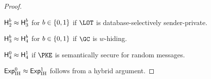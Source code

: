 \begin{proof}
\begin{claim}\label{clm:index-hiding-hyb23}
${\Hyb_2^b\approx\Hyb_3^b}$ for ${b\in{\{0,1\}}}$
if $\LOT$ is database-selectively sender-private.
\end{claim}

\begin{claim}\label{clm:index-hiding-hyb34}
${\Hyb_3^b\approx\Hyb_4^b}$ for ${b\in{\{0,1\}}}$
if $\GC$ is $w$-hiding.
\end{claim}

\begin{claim}\label{clm:index-hiding-hyb4}
${\Hyb_4^0\approx\Hyb_4^1}$
if $\PKE$ is semantically secure for random messages.
\end{claim}

\noindent
${\ExpIH{0}\approx\ExpIH{1}}$ follows from a hybrid argument.
\end{proof}
